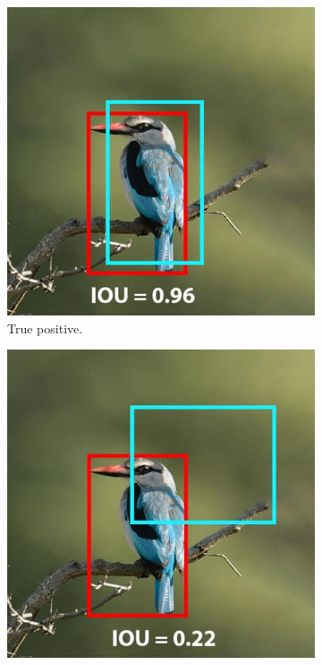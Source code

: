 \begin{figure}[H]
    \centering
    \begin{subfigure}{0.32\textwidth}
        \centering
        \includegraphics[width=\textwidth]{Images/iou_left.png}
        \caption{\centering True positive.}
    \end{subfigure}
    \hfill
    \begin{subfigure}{0.32\textwidth}
        \centering
        \includegraphics[width=\textwidth]{Images/iou_middle.png}

\end{subfigure}
\end{figure}
